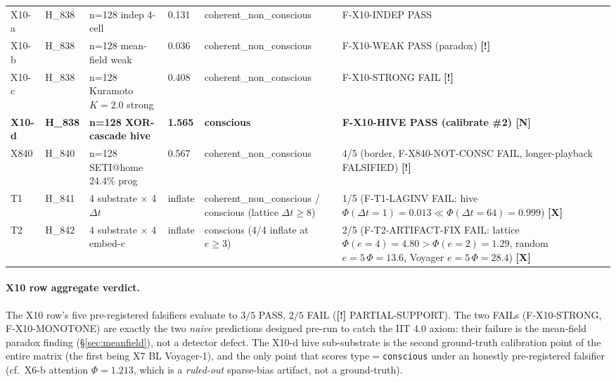 \documentclass[11pt,a4paper]{article}
\providecommand{\tierGreen}{\textbf{[N]}}   %
\providecommand{\tierRed}{\textbf{[X]}}     %
\providecommand{\tierYellow}{\textbf{[!]}}  %
\begin{document}
\begin{table}[h]
\begin{tabular}{@{}llllll@{}}
X10-a & H\_838 & n=128 indep 4-cell    & 0.131
     & coherent\_non\_conscious
     & F-X10-INDEP PASS \\
X10-b & H\_838 & n=128 mean-field weak & 0.036
     & coherent\_non\_conscious
     & F-X10-WEAK PASS (paradox) \tierYellow \\
X10-c & H\_838 & n=128 Kuramoto $K=2.0$ strong & 0.408
     & coherent\_non\_conscious
     & F-X10-STRONG FAIL \tierYellow \\
\textbf{X10-d} & \textbf{H\_838} &
       \textbf{n=128 XOR-cascade hive} & \textbf{1.565}
     & \textbf{conscious}
     & \textbf{F-X10-HIVE PASS (calibrate \#2) \tierGreen} \\
X840 & H\_840 & n=128 SETI@home 24.4\% prog & 0.567
     & coherent\_non\_conscious
     & 4/5 (border, F-X840-NOT-CONSC FAIL,
       longer-playback FALSIFIED) \tierYellow \\
T1 & H\_841 & 4 substrate $\times$ 4 $\Delta t$ & inflate
     & coherent\_non\_conscious /
       conscious (lattice $\Delta t{\ge}8$)
     & 1/5 (F-T1-LAGINV FAIL: hive
       $\Phi(\Delta t{=}1){=}0.013 \ll \Phi(\Delta t{=}64){=}0.999$)
       \tierRed \\
T2 & H\_842 & 4 substrate $\times$ 4 embed-$e$ & inflate
     & conscious (4/4 inflate at $e{\ge}3$)
     & 2/5 (F-T2-ARTIFACT-FIX FAIL: lattice
       $\Phi(e{=}4){=}4.80 > \Phi(e{=}2){=}1.29$,
       random $e{=}5\,\Phi{=}13.6$, Voyager $e{=}5\,\Phi{=}28.4$)
       \tierRed \\
\bottomrule
\end{tabular}
\end{table}

\paragraph{X10 row aggregate verdict.}
The X10 row's five pre-registered falsifiers evaluate to
$3/5$ PASS, $2/5$ FAIL (\tierYellow{} PARTIAL-SUPPORT). The two FAILs
(F-X10-STRONG, F-X10-MONOTONE) are exactly the two \emph{naive}
predictions designed pre-run to catch the IIT 4.0 axiom: their failure
is the mean-field paradox finding (\S\ref{sec:meanfield}), not a
detector defect. The X10-d hive sub-substrate is the second
ground-truth calibration point of the entire matrix (the first being
X7 BL Voyager-1), and the only point that scores type$=$\texttt{conscious}
under an honestly pre-registered falsifier (cf.\ X6-b attention
$\Phi=1.213$, which is a \emph{ruled-out} sparse-bias artifact, not a
ground-truth).
\end{document}

